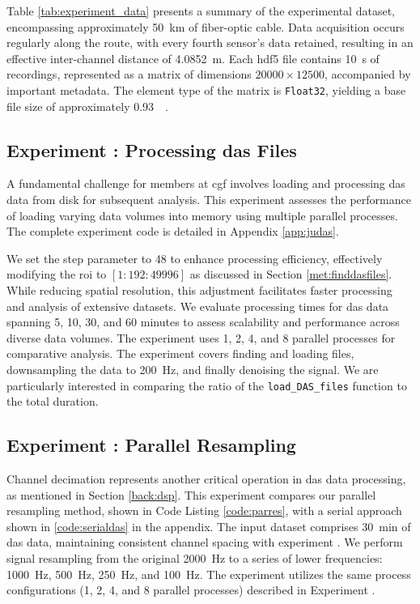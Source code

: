 Table \ref{tab:experiment_data} presents a summary of the experimental dataset, encompassing approximately \qty{50}{\kilo\meter} of fiber-optic cable. Data acquisition occurs regularly along the route, with every fourth sensor's data retained, resulting in an effective inter-channel distance of \qty{4.0852}{\meter}. Each \acrshort{hdf5} file contains \qty{10}{\second} of recordings, represented as a matrix of dimensions $20000 \times 12500$, accompanied by important metadata. The element type of the matrix is \texttt{Float32}, yielding a base file size of approximately \qty{0.93}{\giga\byte}.

\subsection{Experiment : Processing \acrshort{das} Files}
A fundamental challenge for members at \acrshort{cgf} involves loading and processing \acrshort{das} data from disk for subsequent analysis. This experiment assesses the performance of loading varying data volumes into memory using multiple parallel processes. The complete experiment code is detailed in Appendix \ref{app:judas}.

We set the step parameter to 48 to enhance processing efficiency, effectively modifying the \acrshort{roi} to $[1:192:49996]$ as discussed in Section \ref{met:finddasfiles}. While reducing spatial resolution, this adjustment facilitates faster processing and analysis of extensive datasets. We evaluate processing times for \acrshort{das} data spanning 5, 10, 30, and 60 minutes to assess scalability and performance across diverse data volumes. The experiment uses 1, 2, 4, and 8 parallel processes for comparative analysis. The experiment covers finding and loading files, downsampling the data to \qty{200}{\hertz}, and finally denoising the signal. We are particularly interested in comparing the ratio of the \lstinline{load_DAS_files} function to the total duration.

\subsection{Experiment : Parallel Resampling}
Channel decimation represents another critical operation in \acrshort{das} data processing, as mentioned in Section \ref{back:dsp}. This experiment compares our parallel resampling method, shown in Code Listing \ref{code:parres}, with a serial approach shown in \ref{code:serialdas} in the appendix. The input dataset comprises \qty{30}{\minute} of \acrshort{das} data, maintaining consistent channel spacing with experiment . We perform signal resampling from the original \qty{2000}{\hertz} to a series of lower frequencies: \qty{1000}{\hertz}, \qty{500}{\hertz}, \qty{250}{\hertz}, and \qty{100}{\hertz}. The experiment utilizes the same process configurations (1, 2, 4, and 8 parallel processes) described in Experiment .

